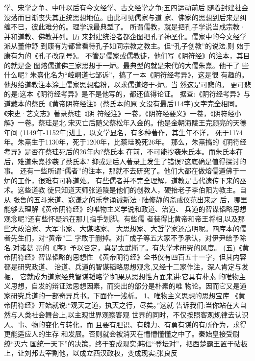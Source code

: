 \documentclass[12pt,UTF8]{ctexbook}
\begin{document}
学、宋学之争、中叶以后有今文经学、古文经学之争;五四运动前后
随着封建社会没落而日渐丧失其正统思想地位。由此可见儒家与道
家、佛家的思想到后来是纠缠不已，彼此难分的。理学派最典型了。
所谓儒教，就是把孔子学说当成宗教·并和道教、佛教并列。历
来封建统治者都企图把孔子神圣化。儒家中的今文经学派从董仲舒
到康有为都曾看待孔子如同宗教之教主。但“孔子创教”的说法.则
始于康有为的《孔子改制号》。
不管是儒家或儒教徒，他们写《阴符经》的注本，其目的就是企
图熔儒道佛三家思想于一炉。最典型的就是宋代的大儒朱熹。他干了
些什么呢?
朱熹化名为“崆峒道七邹诉”，搞了一本《阴符经考异》，这是很
有趣的。他想给道教注本涂上儒家思想脂粉，以求儒道熔于-炉。当
然这是可悲的。
更可悲的是:这本《阴符经考异》是不是他写的，都还值得论证。
据查:《阴符经考异》与道藏本的蔡氏《黄帝阴符经注》(蔡氏本的原
文没有最后114字)文字完全相同。《宋史·艺文志》著录蔡珪《阴
符经注》一卷，《阴符经要义》一卷，《阴符经小解》一卷。蔡珪是北
宋灭亡后随父蔡松年入金的。他是金朝海陵王完颜亮的天德年间
(1149年-1152年)进士，以文学显名，有多种著作，其生年不详，
死于1174年。朱熹生于1130年，死于1200年，比蔡珪晚死26年。
那么，朱熹搞的《阴符经考异》是否在蔡珪死后的26年内?蔡氏本
在前，不可能抄袭朱氏本。而朱氏本在后，难道朱熹抄袭了蔡氏本?
抑或是后人著录上发生了错误?这底确是值得探讨的事。
还有一些所谓“儒者”的注本，那就不去研究了。他们大都在做熔儒道佛于一炉的工作，很难有可称道处。
有些儒者并不完全理解，道教是古代遗传下来的巫术。这些道教
徒只知道天师张道陵是他们的创教人，硬抬老子李伯阳为教主。自从
张鲁的五斗米道、寇谦之的乐章诵诫新法·陆修静的斋戒仪范出来之
后，哪里能够去理解《黄帝阴符经》的唯物主义学说和政道、治道、
兵道的智谋韬略思想观念呢?还有些怀疑派在那儿指手划脚。有些儒
者装得比黄帝和帝王将相,以及那些大政治家、大军事家、大谋略家、
大思想家、大哲学家还高明呢。四库本的儒者先生们，对“黄帝”二
字敢于删掉。对广成子等五大家不予承认，对伊尹给予除名.对诸葛
亮的《序》予以否定，真是太武断了。有失学术研究的风度。
(五)《黄帝阴符经》智谋韬略的思想性
《黄帝阴符经》全书仅有四百五十一字，但其内容都是研究政道、
治道、兵道的智谋韬略思想观念,又经十二家作注，深人肯定与发掘，
它就成为道家经典智谋韬略学!如果从思想性方面来讲:它具有朴素
的唯物主义思想，自发的辩证法思想因素，而突出的部分是朴素的唯
物论。因而它又是道家研究兵道的一部奇异兵书。下面作一浅析。
1、唯物主义思想的思想宝库
《黄帝阴符经》开始就说:“观天之道，执天之行，尽矣。”这就
告诉我们:当你站在大自然与人类社会舞台上,以主观世界观察客观
世界的同时，不仅按照客观规律去认识人、事、物的变化与转化，而
且要有胆识、有魄力、有勇有谋的有所作为，求得更能适应人的生存
和发展。否则就会被消灭在懵懵懂懂之中了。秦始皇接受尉缭“灭六
国统一天下”的决策，终于变成现实;韩信“登坛对”，把西楚霸王置于砧板上，让刘邦去宰割他，以成立西汉政权，变成现实;张良反
\end{document}

